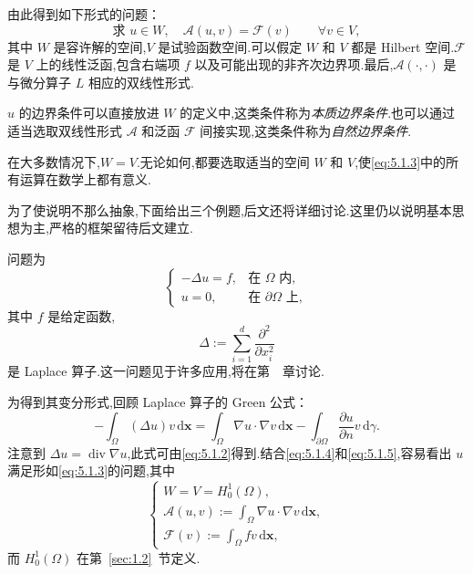 由此得到如下形式的问题：
\begin{equation}\label{eq:5.1.3}
  \text{求 }u\in W,\quad \mathcal A(u,v)=\mathcal F(v)
  \qquad\forall v\in V,
\end{equation}
其中 \(W\) 是容许解的空间,\(V\) 是试验函数空间.可以假定 \(W\) 和 \(V\) 都是 Hilbert 空间.\(\mathcal F\) 是 \(V\) 上的线性泛函,包含右端项 \(f\) 以及可能出现的非齐次边界项.最后,\(\mathcal A(\cdot,\cdot)\) 是与微分算子 \(L\) 相应的双线性形式.

\(u\) 的边界条件可以直接放进 \(W\) 的定义中,这类条件称为\emph{本质边界条件}.也可以通过适当选取双线性形式 \(\mathcal A\) 和泛函 \(\mathcal F\) 间接实现,这类条件称为\emph{自然边界条件}.

在大多数情况下,\(W=V\).无论如何,都要选取适当的空间 \(W\) 和 \(V\),使\eqref{eq:5.1.3}中的所有运算在数学上都有意义.

为了使说明不那么抽象,下面给出三个例题,后文还将详细讨论.这里仍以说明基本思想为主,严格的框架留待后文建立.

\begin{example}[(Poisson 问题)]\label{ex:5.1.1}
问题为
\begin{equation}\label{eq:5.1.4}
  \begin{cases}
    -\Delta u=f,&\text{在 }\Omega\text{ 内},\\
    u=0,&\text{在 }\partial\Omega\text{ 上},
  \end{cases}
\end{equation}
其中 \(f\) 是给定函数,
\[
  \Delta:=\sum_{i=1}^d\frac{\partial^2}{\partial x_i^2}
\]
是 Laplace 算子.这一问题见于许多应用,将在第~~章讨论.

为得到其变分形式,回顾 Laplace 算子的 Green 公式：
\begin{equation}\label{eq:5.1.5}
  -\int_\Omega(\Delta u)v\,\mathrm d\boldsymbol{x}
  =\int_\Omega\nabla u\cdot\nabla v\,\mathrm d\boldsymbol{x}
    -\int_{\partial\Omega}\frac{\partial u}{\partial n}v\,\mathrm d\gamma.
\end{equation}
注意到 \(\Delta u=\operatorname{div}\nabla u\),此式可由\eqref{eq:5.1.2}得到.结合\eqref{eq:5.1.4}和\eqref{eq:5.1.5},容易看出 \(u\) 满足形如\eqref{eq:5.1.3}的问题,其中
\begin{equation}\label{eq:5.1.6}
  \begin{cases}
    W=V=H_0^1(\Omega),\\
    \mathcal A(u,v):=\displaystyle\int_\Omega\nabla u\cdot\nabla v\,\mathrm d\boldsymbol{x},\\
    \mathcal F(v):=\displaystyle\int_\Omega fv\,\mathrm d\boldsymbol{x},
  \end{cases}
\end{equation}
而 \(H_0^1(\Omega)\) 在第~\ref{sec:1.2}~节定义.
\end{example}

